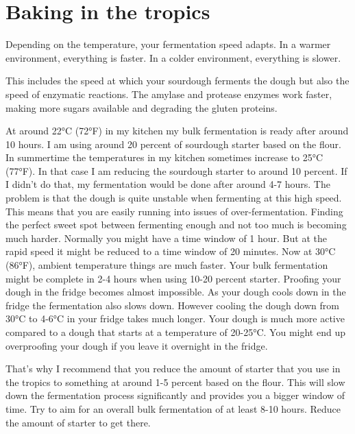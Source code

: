 \section{Baking in the tropics}

Depending on the temperature, your fermentation speed adapts.
In a warmer environment, everything is faster. In a colder
environment, everything is slower.

This includes the speed at which your sourdough ferments
the dough but also the speed of enzymatic reactions. The
amylase and protease enzymes work faster, making more
sugars available and degrading the gluten proteins.

At around 22°C (72°F) in my kitchen my bulk fermentation is ready
after around 10 hours. I am using around 20 percent of sourdough
starter based on the flour. In summertime the temperatures
in my kitchen sometimes increase to 25°C (77°F). In that case
I am reducing the sourdough starter to around 10 percent.
If I didn't do that, my fermentation would be done after
around 4-7 hours. The problem is that the dough is quite
unstable when fermenting at this high speed. This means
that you are easily running into issues of over-fermentation.
Finding the perfect sweet spot between fermenting enough
and not too much is becoming much harder. Normally you might
have a time window of 1 hour. But at the rapid speed it
might be reduced to a time window of 20 minutes. Now at
30°C (86°F), ambient temperature things are much faster. Your bulk
fermentation might be complete in 2-4 hours when using
10-20 percent starter. Proofing your dough in the fridge
becomes almost impossible. As your dough cools down in the
fridge the fermentation also slows down. However cooling the
dough down from 30°C to 4-6°C in your fridge takes much
longer. Your dough is much more active compared to a dough
that starts at a temperature of 20-25°C. You might
end up overproofing your dough if you leave it overnight
in the fridge.

That's why I recommend that you reduce the amount of starter
that you use in the tropics to something at around 1-5 percent
based on the flour. This will slow down the fermentation
process significantly and provides you a bigger window
of time. Try to aim for an overall bulk fermentation of at
least 8-10 hours. Reduce the amount of starter to get there.

